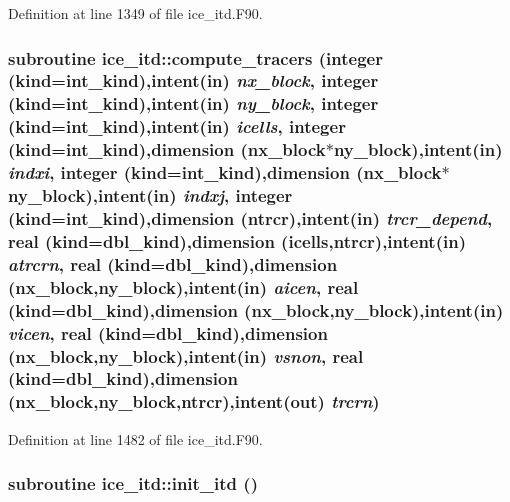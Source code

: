 Definition at line 1349 of file ice\_\-itd.F90.\hypertarget{namespaceice__itd_ae64b7540ec9e84001de195ffec097bc3}{
\subsubsection[{compute\_\-tracers}]{\setlength{\rightskip}{0pt plus 5cm}subroutine ice\_\-itd::compute\_\-tracers (integer (kind=int\_\-kind),intent(in) {\em nx\_\-block}, \/  integer (kind=int\_\-kind),intent(in) {\em ny\_\-block}, \/  integer (kind=int\_\-kind),intent(in) {\em icells}, \/  integer (kind=int\_\-kind),dimension (nx\_\-block$\ast$ny\_\-block),intent(in) {\em indxi}, \/  integer (kind=int\_\-kind),dimension (nx\_\-block$\ast$ny\_\-block),intent(in) {\em indxj}, \/  integer (kind=int\_\-kind),dimension (ntrcr),intent(in) {\em trcr\_\-depend}, \/  real (kind=dbl\_\-kind),dimension (icells,ntrcr),intent(in) {\em atrcrn}, \/  real (kind=dbl\_\-kind),dimension (nx\_\-block,ny\_\-block),intent(in) {\em aicen}, \/  real (kind=dbl\_\-kind),dimension (nx\_\-block,ny\_\-block),intent(in) {\em vicen}, \/  real (kind=dbl\_\-kind),dimension (nx\_\-block,ny\_\-block),intent(in) {\em vsnon}, \/  real (kind=dbl\_\-kind),dimension (nx\_\-block,ny\_\-block,ntrcr),intent(out) {\em trcrn})}}
\label{namespaceice__itd_ae64b7540ec9e84001de195ffec097bc3}


Definition at line 1482 of file ice\_\-itd.F90.\hypertarget{namespaceice__itd_a2c5da98ae0797cd69f98ffce134e4ef7}{
\subsubsection[{init\_\-itd}]{\setlength{\rightskip}{0pt plus 5cm}subroutine ice\_\-itd::init\_\-itd ()}}
\label{namespaceice__itd_a2c5da98ae0797cd69f98ffce134e4ef7}


